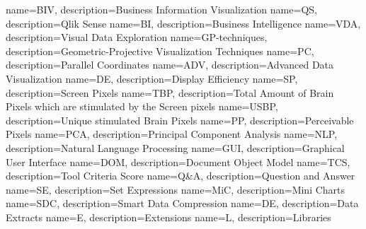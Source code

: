 

 {
   name=BIV,
   description={Business Information Visualization}
}
 {
   name=QS,
   description={Qlik Sense}
}
 {
   name=BI,
   description={Business Intelligence}
}
 {
   name=VDA,
   description={Visual Data Exploration}
}
 {
   name=GP-techniques,
   description={Geometric-Projective Visualization Techniques}
}
 {
   name=PC,
   description={Parallel Coordinates}
}
 {
   name=ADV,
   description={Advanced Data Visualization}
}
 {
   name=DE,
   description={Display Efficiency}
}
 {
   name=SP,
   description={Screen Pixels}
}
 {
   name=TBP,
   description={Total Amount of Brain Pixels which are stimulated by the Screen pixels}
}
 {
   name=USBP,
   description={Unique stimulated Brain Pixels}
}
 {
   name=PP,
   description={Perceivable Pixels}
}
 {
   name=PCA,
   description={Principal Component Analysis}
}
 {
   name=NLP,
   description={Natural Language Processing}
}
 {
   name=GUI,
   description={Graphical User Interface}
}
 {
   name=DOM,
   description={Document Object Model}
}
 {
   name=TCS,
   description={Tool Criteria Score}
}
{
    name=Q\&A,
    description={Question and Answer}
}
{
    name=SE,
    description={Set Expressions}
}
{
    name=MiC,
    description={Mini Charts}
    }
{
    name=SDC,
    description={Smart Data Compression}
}
{
    name=DE,
    description={Data Extracts}
}
{
    name=E,
    description={Extensions}
}
{
    name=L,
    description={Libraries}
}
